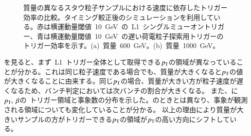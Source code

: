 \begin{figure}[tbp]
\begin{minipage}{0.49\hsize}
    \subcaption{}
    \end{minipage}
    \caption[質量の異なるスタウ粒子サンプルにおける速度に依存したトリガー効率の比較]{質量の異なるスタウ粒子サンプルにおける速度に依存したトリガー効率の比較。タイミング較正後のシミュレーションを利用している。赤は横運動量閾値~10~GeV~の~L1~シングルミューオントリガー、青は横運動量閾値~10~GeV~の遅い荷電粒子探索用トリガーのトリガー効率を示す。(a)~質量~600~GeV。(b)~質量~1000~GeV。}\label{fig:tribeta6}
\end{figure}
を見ると、まず~L1~トリガー全体として取得できる$p_{\rm{T}}$の領域が異なっていることが分かる。これは同じ粒子速度である場合でも、質量が大きくなると$p_{\rm{T}}$の値が大きくなることに由来する。同じ$p_{\rm{T}}$の場合、質量が大きい方が粒子速度が遅くなるため、バンチ判定においては次バンチの割合が大きくなる。
また、に$p_{\rm{T}},~\beta$の~トリガー領域と事象数の分布を示した。のときとは異なり、事象が観測される領域についても変化していることが分かる。
以上の理由により質量が大きいサンプルの方がトリガーできる$p_{\rm{T}}$の領域が$p_{\rm{T}}$の高い方向にシフトしている。


